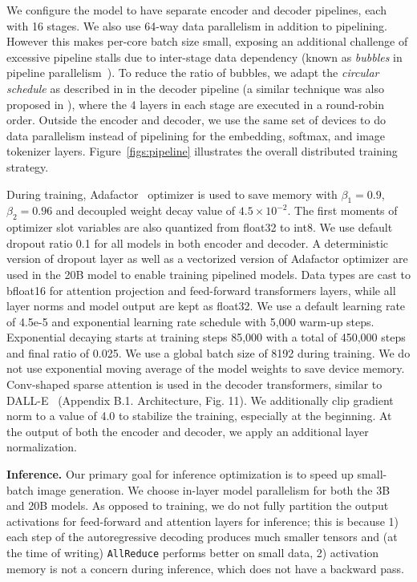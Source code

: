 We configure the model to have separate encoder and decoder pipelines, each with 16 stages. We also use 64-way data parallelism in addition to pipelining. However this makes per-core batch size small, exposing an additional challenge of excessive pipeline stalls due to inter-stage data dependency (known as \textit{bubbles} in pipeline parallelism~\cite{gpipe}). To reduce the ratio of bubbles, we adapt the \emph{circular schedule} as described in \cite{xu2021gspmd} in the decoder pipeline (a similar technique was also proposed in \cite{megatron21}), where the 4 layers in each stage are executed in a round-robin order. Outside the encoder and decoder, we use the same set of devices to do data parallelism instead of pipelining for the embedding, softmax, and image tokenizer layers. Figure~\ref{figs:pipeline} illustrates the overall distributed training strategy.

During training, Adafactor~\cite{shazeer2018adafactor} optimizer is used to save memory with $\beta_1 = 0.9$, $\beta_2 = 0.96$ and decoupled weight decay value of $4.5\times 10^{-2}$. The first moments of optimizer slot variables are also quantized from float32 to int8. We use default dropout ratio 0.1 for all models in both encoder and decoder. A deterministic version of dropout layer as well as a vectorized version of Adafactor optimizer are used in the 20B model to enable training pipelined models. Data types are cast to bfloat16 for attention projection and feed-forward transformers layers, while all layer norms and model output are kept as float32. We use a default learning rate of 4.5e-5 and exponential learning rate schedule with 5,000 warm-up steps. Exponential decaying starts at training steps 85,000 with a total of 450,000 steps and final ratio of 0.025. We use a global batch size of 8192 during training. We do not use exponential moving average of the model weights to save device memory. Conv-shaped sparse attention is used in the decoder transformers, similar to DALL-E~\cite{ramesh2021zero} (Appendix B.1. Architecture, Fig. 11). We additionally clip gradient norm to a value of 4.0 to stabilize the training, especially at the beginning. At the output of both the encoder and decoder, we apply an additional layer normalization.

\textbf{Inference.} Our primary goal for inference optimization is to speed up small-batch image generation. We choose in-layer model parallelism for both the 3B and 20B models. As opposed to training, we do not fully partition the output activations for feed-forward and attention layers for inference; this is because 1) each step of the autoregressive decoding produces much smaller tensors and (at the time of writing) \texttt{AllReduce} performs better on small data, 2) activation memory is not a concern during inference, which does not have a backward pass.